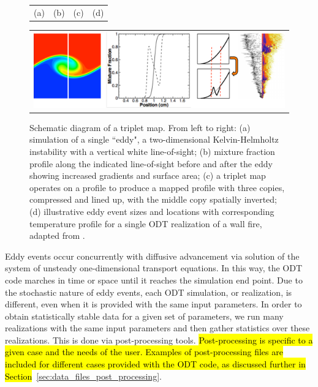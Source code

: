 \documentclass[preprint,12pt, a4paper]{elsarticle}
\begin{document}
\begin{figure}
		\begin{tabular}{llll}
			\hspace{40pt}(a) & \hspace{100pt} (b) & \hspace{70pt} (c) & \hspace{50pt}(d) 
		\end{tabular}
	\begin{center}
		\begin{tabular}{c}
            \includegraphics[width=\textwidth]{fig_tripmap.pdf} 
		\end{tabular}
	\end{center}
    \caption{Schematic diagram of a triplet map. From left to right: (a) simulation of a single ``eddy", a two-dimensional Kelvin-Helmholtz instability with a vertical white line-of-sight; (b) mixture fraction profile along the indicated line-of-sight before and after the eddy showing increased gradients and surface area; (c) a triplet map operates on a profile to produce a mapped profile with three copies, compressed and lined up, with the middle copy spatially inverted; (d) illustrative eddy event sizes and locations with corresponding temperature profile for a single ODT realization of a wall fire, adapted from \cite{Monson_2016}.}
\label{fig:tripletmap}
\end{figure}

Eddy events occur concurrently with diffusive advancement via solution of the system of unsteady one-dimensional transport equations. In this way, the ODT code marches in time or space until it reaches the simulation end point. Due to the stochastic nature of eddy events, each ODT simulation, or realization, is different, even when it is provided with the same input parameters. In order to obtain statistically stable data for a given set of parameters, we run many realizations with the same input parameters and then gather statistics over these realizations. This is done via post-processing tools. \hl{Post-processing is specific to a given case and the needs of the user. Examples of post-processing files are included for different cases provided with the ODT code, as discussed further in Section}~\ref{sec:data_files_post_processing}.
\end{document}
